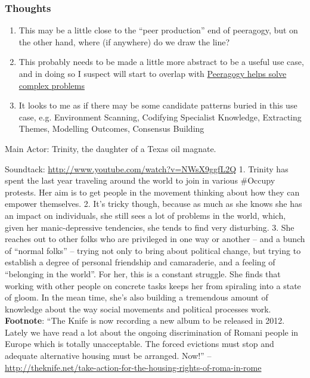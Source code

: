 \subsubsection{Thoughts}

\begin{enumerate}
\item
  This may be a little close to the ``peer production'' end of
  peeragogy, but on the other hand, where (if anywhere) do we draw the
  line?
\item
  This probably needs to be made a little more abstract to be a useful
  use case, and in doing so I suspect will start to overlap with
  \href{http://metameso.org/peeragogy/patterns-usecases/use-cases/peeragogy-helps-solve-complex-problems/}{Peeragogy
  helps solve complex problems}
\item
  It looks to me as if there may be some candidate patterns buried in
  this use case, e.g. Environment Scanning, Codifying Specialist
  Knowledge, Extracting Themes, Modelling Outcomes, Consensus Building
\end{enumerate}
Main Actor: Trinity, the daughter of a Texas oil magnate.

Soundtack:
\href{http://www.youtube.com/watch?v=NWsX9ggfL2Q}{http://www.youtube.com/watch?v=NWsX9ggfL2Q}
1. Trinity has spent the last year traveling around the world to join in
various \#Occupy protests. Her aim is to get people in the movement
thinking about how they can empower themselves. 2. It's tricky though,
because as much as she knows she has an impact on individuals, she still
sees a lot of problems in the world, which, given her manic-depressive
tendencies, she tends to find very disturbing. 3. She reaches out to
other folks who are privileged in one way or another -- and a bunch of
``normal folks'' -- trying not only to bring about political change, but
trying to establish a degree of personal friendship and camaraderie, and
a feeling of ``belonging in the world''. For her, this is a constant
struggle. She finds that working with other people on concrete tasks
keeps her from spiraling into a state of gloom. In the mean time, she's
also building a tremendous amount of knowledge about the way social
movements and political processes work. \textbf{Footnote}: ``The Knife
is now recording a new album to be released in 2012. Lately we have read
a lot about the ongoing discrimination of Romani people in Europe which
is totally unacceptable. The forced evictions must stop and adequate
alternative housing must be arranged. Now!'' --
\href{http://theknife.net/take-action-for-the-housing-rights-of-roma-in-rome}{http://theknife.net/take-action-for-the-housing-rights-of-roma-in-rome}

